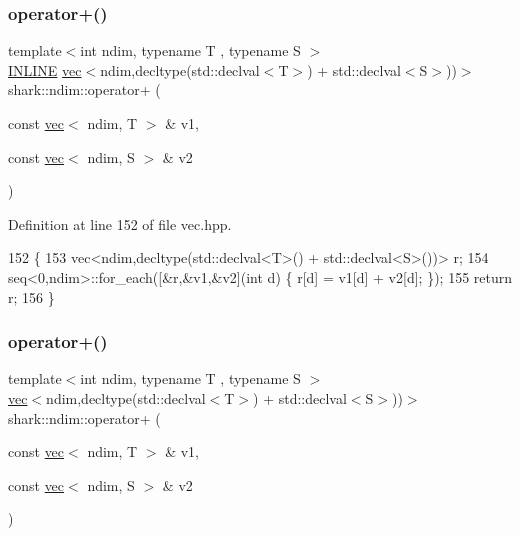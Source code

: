\subsubsection{\texorpdfstring{operator+()}{operator+()}\hspace{0.1cm}{\footnotesize\ttfamily [1/5]}}
{\footnotesize\ttfamily template$<$int ndim, typename T , typename S $>$ \\
\hyperlink{common_8hpp_a2eb6f9e0395b47b8d5e3eeae4fe0c116}{I\+N\+L\+I\+NE} \hyperlink{structshark_1_1ndim_1_1vec}{vec}$<$ndim,decltype(std\+::declval$<$T$>$) + std\+::declval$<$S$>$))$>$ shark\+::ndim\+::operator+ (\begin{DoxyParamCaption}\item[{const \hyperlink{structshark_1_1ndim_1_1vec}{vec}$<$ ndim, T $>$ \&}]{v1,  }\item[{const \hyperlink{structshark_1_1ndim_1_1vec}{vec}$<$ ndim, S $>$ \&}]{v2 }\end{DoxyParamCaption})\hspace{0.3cm}{\ttfamily [inline]}}



Definition at line 152 of file vec.\+hpp.


\begin{DoxyCode}
152                                                                                                            
                        \{
153             vec<ndim,decltype(std::declval<T>() + std::declval<S>())> r;
154             seq<0,ndim>::for\_each([&r,&v1,&v2](\textcolor{keywordtype}{int} d) \{ r[d] = v1[d] + v2[d]; \});
155             \textcolor{keywordflow}{return} r;
156         \}
\end{DoxyCode}
\hypertarget{namespaceshark_1_1ndim_a6b4a69e43ee7955d541f6a7a1e9d9ba6}{}\label{namespaceshark_1_1ndim_a6b4a69e43ee7955d541f6a7a1e9d9ba6} 
\subsubsection{\texorpdfstring{operator+()}{operator+()}\hspace{0.1cm}{\footnotesize\ttfamily [2/5]}}
{\footnotesize\ttfamily template$<$int ndim, typename T , typename S $>$ \\
\hyperlink{structshark_1_1ndim_1_1vec}{vec}$<$ndim,decltype(std\+::declval$<$T$>$) + std\+::declval$<$S$>$))$>$ shark\+::ndim\+::operator+ (\begin{DoxyParamCaption}\item[{const \hyperlink{structshark_1_1ndim_1_1vec}{vec}$<$ ndim, T $>$ \&}]{v1,  }\item[{const \hyperlink{structshark_1_1ndim_1_1vec}{vec}$<$ ndim, S $>$ \&}]{v2 }\end{DoxyParamCaption})\hspace{0.3cm}{\ttfamily [inline]}}



